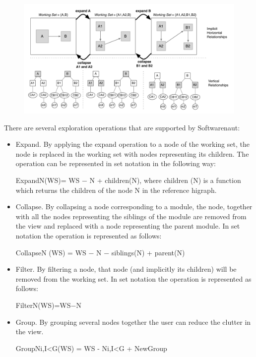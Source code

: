 \documentclass[preprint,12pt]{elsarticle}
\begin{document}
\begin{figure}[h]
\begin{center}
\includegraphics[width=\linewidth]{images/SnautSequence}
\caption{}
\label{}
\end{center}
\end{figure}

There are several exploration operations that are supported by Softwarenaut:

\begin{itemize}

\item Expand. By applying the expand operation to a node of the working set, the node is replaced in the working set with nodes representing its children. The operation can be represented in set notation in the following way:

ExpandN(WS)= WS − N + children(N), where children (N) is a function 	which returns the children of the node N in the reference higraph.

\item Collapse. By collapsing a node corresponding to a module, the node, together with all the nodes representing the siblings of the module are removed from the view and replaced with a node representing the parent module. In set notation the operation is represented as follows:

CollapseN (WS) = WS − N − siblings(N) + parent(N)

\item Filter.
By filtering a node, that node (and implicitly its children) will be removed from the working set. In set notation the operation is represented as follows:

FilterN(WS)=WS−N


\item Group.
By grouping several nodes together the user can reduce the clutter in the view. 

GroupNi,I<G(WS) = WS - Ni,I<G + NewGroup


\end{itemize}
\end{document}
